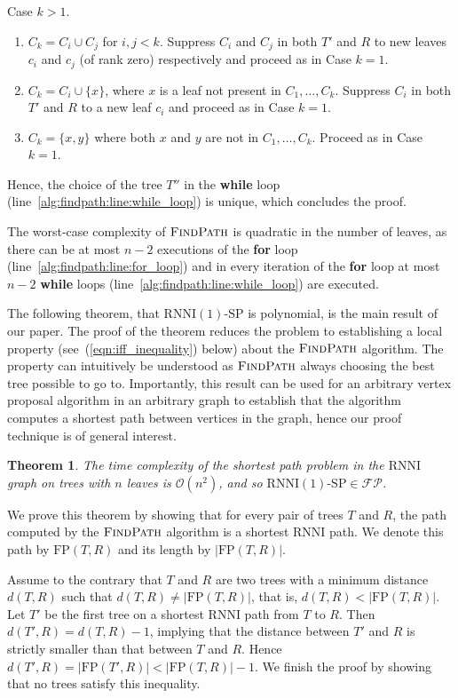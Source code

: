 \documentclass[11pt]{amsart}
\newtheorem{theorem}{Theorem}
\newcommand{\rnni}{\mathrm{RNNI}}
\newcommand{\findpath}{\textsc{FindPath}}
\newcommand{\fp}{\mathrm{FP}}
\newcommand{\fpc}{\mathcal{FP}}
\newcommand{\decprob}[1]{\rnni(#1)\text{-}\mathrm{SP}}
\renewcommand{\O}{\mathcal O}
\begin{document}
Case $k > 1$.
\begin{enumerate}
\item $C_k = C_i \cup C_j$ for $i, j < k$.
Suppress $C_i$ and $C_j$ in both $T'$ and $R$ to new leaves $c_i$ and $c_j$ (of rank zero) respectively and proceed as in Case $k = 1$.
\item $C_k = C_i \cup \{x\}$, where $x$ is a leaf not present in $C_1, \ldots, C_k$.
Suppress $C_i$ in both $T'$ and $R$ to a new leaf $c_i$ and proceed as in Case $k = 1$.
\item $C_k = \{x, y\}$ where both $x$ and $y$ are not in $C_1, \ldots, C_k$.
Proceed as in Case $k = 1$.
\end{enumerate}

Hence, the choice of the tree $T''$ in the \textbf{while} loop (line~\ref{alg:findpath:line:while_loop}) is unique, which concludes the proof.
\endproof

The worst-case complexity of $\findpath$ is quadratic in the number of leaves, as there can be at most $n-2$ executions of the \textbf{for} loop (line~\ref{alg:findpath:line:for_loop}) and in every iteration of the \textbf{for} loop at most $n-2$ \textbf{while} loops (line~\ref{alg:findpath:line:while_loop}) are executed.

The following theorem, that $\decprob{1}$ is polynomial, is the main result of our paper.
The proof of the theorem reduces the problem to establishing a local property (see~(\ref{eqn:iff_inequality}) below) about the $\findpath$ algorithm.
The property can intuitively be understood as $\findpath$ always choosing the best tree possible to go to.
Importantly, this result can be used for an arbitrary vertex proposal algorithm in an arbitrary graph to establish that the algorithm computes a shortest path between vertices in the graph, hence our proof technique is of general interest.

\begin{theorem}
The time complexity of the shortest path problem in the $\rnni$ graph on trees with $n$ leaves is $\O(n^2)$, and so $\decprob{1} \in \fpc$.
\label{thm:rnni_polynomial}
\end{theorem}

\proof
We prove this theorem by showing that for every pair of trees $T$ and $R$, the path computed by the $\findpath$ algorithm is a shortest $\rnni$ path.
We denote this path by $\fp(T, R)$ and its length by $|\fp(T, R)|$.

Assume to the contrary that $T$ and $R$ are two trees with a minimum distance $d(T, R)$ such that $d(T,R) \neq |\fp(T,R)|$, that is, $d(T,R) < |\fp(T,R)|$.
Let $T'$ be the first tree on a shortest $\rnni$ path from $T$ to $R$.
Then $d(T',R) = d(T, R) - 1$, implying that the distance between $T'$ and $R$ is strictly smaller than that between $T$ and $R$.
Hence $d(T', R) = |\fp(T',R)| < |\fp(T,R)| - 1$.
We finish the proof by showing that no trees satisfy this inequality.
\end{document}
